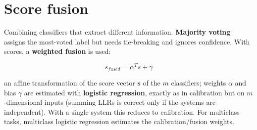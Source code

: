 \section*{Score fusion}

Combining classifiers that extract different information. \textbf{Majority voting} assigns the most-voted label but needs tie-breaking and ignores confidence. With scores, a \textbf{weighted fusion} is used:

$$s_{fused} = \alpha^T s + \gamma$$

an affine transformation of the score vector $\mathbf{s}$ of the $m$ classifiers; weights $\alpha$ and bias $\gamma$ are estimated with \textbf{logistic regression}, exactly as in calibration but on $m$-dimensional inputs (summing LLRs is correct only if the systems are independent). With a single system this reduces to calibration. For multiclass tasks, multiclass logistic regression estimates the calibration/fusion weights.
